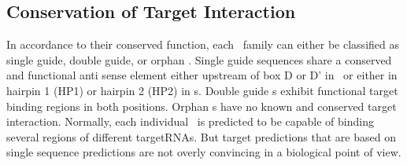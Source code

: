 %
%
%
%
%
%
%
%
%



\subsection{Conservation of Target Interaction}

In accordance to their conserved function, each \sno\ family can
either be classified as single guide, double guide, or orphan
\sno. Single guide sequences share a conserved and functional anti
sense element either upstream of box D or D' in \cd\ or either in
hairpin 1 (HP1) or hairpin 2 (HP2) in \haca s. Double guide \sno s
exhibit functional target binding regions in both positions. Orphan
\sno s have no known and conserved target interaction. Normally, each
individual \sno\ is predicted to be capable of binding several regions
of different targetRNAs. But target predictions that are based on
single sequence predictions are not overly convincing in a biological
point of view.

